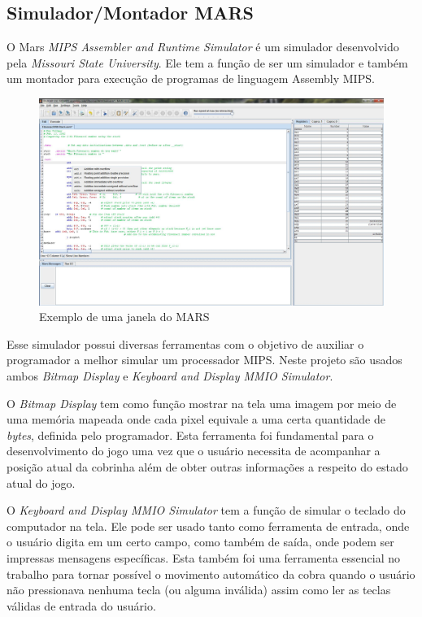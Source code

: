 \documentclass[a4paper]{sbgames}
\begin{document}
{\subsection{Simulador/Montador MARS}{
\label{sec:Mars}
O Mars \textit{MIPS Assembler and Runtime Simulator} \cite{Mars1} é um simulador desenvolvido pela \textit{Missouri State University}. Ele tem a função de ser um simulador e também um montador para execução de programas de linguagem Assembly MIPS. 

\begin{figure}[htb]
  \begin{center}
   \includegraphics[width=1.0\linewidth]{./Figures/marscode.jpg}
  \end{center}
  \caption{Exemplo de uma janela do MARS}
  \label{fig:07}
\end{figure}

Esse simulador possui diversas ferramentas com o objetivo de auxiliar o programador a melhor simular um processador MIPS. Neste projeto são usados ambos \textit{Bitmap Display} e \textit{Keyboard and Display MMIO Simulator}.

O \textit{Bitmap Display} tem como função mostrar na tela uma imagem por meio de uma memória mapeada onde cada pixel equivale a uma certa quantidade de \textit{bytes}, definida pelo programador. Esta ferramenta foi fundamental para o desenvolvimento do jogo uma vez que o usuário necessita de acompanhar a posição atual da cobrinha além de obter outras informações a respeito do estado atual do jogo.

O \textit{Keyboard and Display MMIO Simulator} tem a função de simular o teclado do computador na tela. Ele pode ser usado tanto como ferramenta de entrada, onde o usuário digita em um certo campo, como também de saída, onde podem ser impressas mensagens específicas. Esta também foi uma ferramenta essencial no trabalho para tornar possível o movimento automático da cobra quando o usuário não pressionava nenhuma tecla (ou alguma inválida) assim como ler as teclas válidas de entrada do usuário.

}}
\end{document}
